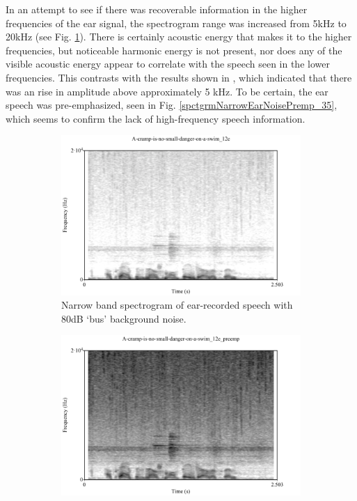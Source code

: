 In an attempt to see if there was recoverable information in the higher frequencies of the ear signal, the spectrogram range was increased from 5kHz to 20kHz (see Fig. \ref{spctgrmEarNarrow20kHz}). There is certainly acoustic energy that makes it to the higher frequencies, but noticeable harmonic energy is not present, nor does any of the visible acoustic energy appear to correlate with the speech seen in the lower frequencies.  This contrasts with the results shown in \cite{hansen:97b}, which indicated that there was an rise in amplitude above approximately 5 kHz.
To be certain, the ear speech was pre-emphasized, seen in Fig. \ref{spctgrmNarrowEarNoisePremp_35}, which seems to confirm the lack of high-frequency speech information. 
\begin{figure}[h!]
\centering
\begin{subfigure}{0.475\textwidth}
  \centering
  \includegraphics[width=1\linewidth]{figure/spctgrmEarNarrow20kHz.pdf}
  \caption{Narrow band spectrogram of ear-recorded speech with 80dB `bus' background noise.}
  \label{spctgrmEarNarrow20kHz}
\end{subfigure}%
\hfill
\begin{subfigure}{0.475\textwidth}
  \centering
  \includegraphics[width=1\linewidth]{figure/spctgrmNarrowEarNoisePremp.pdf}

\end{subfigure}
\end{figure}

